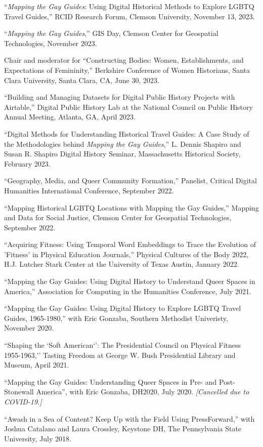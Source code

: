 \documentclass[11pt]{article}
\begin{document}
``\emph{Mapping the Gay Guides}: Using Digital Historical Methods to Explore LGBTQ Travel Guides,'' RCID Research Forum, Clemson University, November 13, 2023.

``\emph{Mapping the Gay Guides},'' GIS Day, Clemson Center for Geospatial Technologies, November 2023. 

Chair and moderator for ``Constructing Bodies: Women, Establishments, and Expectations of Femininity,'' Berkshire Conference of Women Historians, Santa Clara University, Santa Clara, CA, June 30, 2023.

``Building and Managing Datasets for Digital Public History Projects with Airtable,'' Digital Public History Lab at the National Council on Public History Annual Meeting, Atlanta, GA, April 2023. 

``Digital Methods for Understanding Historical Travel Guides: A Case Study of the Methodologies behind \emph{Mapping the Gay Guides},'' L. Dennis Shapiro and Susan R. Shapiro Digital History Seminar, Massachusetts Historical Society, February 2023. 

``Geography, Media, and Queer Community Formation,'' Panelist, Critical Digital Humanities International Conference, September 2022.

``Mapping Historical LGBTQ Locations with Mapping the Gay Guides,'' Mapping and Data for Social Justice, Clemson Center for Geospatial Technologies, September 2022.

``Acquiring Fitness: Using Temporal Word Embeddings to Trace the Evolution of 'Fitness' in Physical Education Journals,'' Physical Cultures of the Body 2022, H.J. Lutcher Stark Center at the University of Texas Austin, January 2022.

``Mapping the Gay Guides: Using Digital History to Understand Queer Spaces in America,'' Association for Computing in the Humanities Conference, July 2021.

``Mapping the Gay Guides: Using Digital History to Explore LGBTQ Travel Guides, 1965-1980,'' with Eric Gonzaba, Southern Methodist Univeristy, November 2020.

``Shaping the `Soft American`': The Presidential Council on Physical Fitness 1955-1963,'' Tasting Freedom at George W. Bush Presidential Library and Museum, April 2021.

``Mapping the Gay Guides: Understanding Queer Spaces in Pre- and Post-Stonewall America'', with Eric Gonzaba, DH2020, July 2020. \emph{[Cancelled due to COVID-19.]}

``Awash in a Sea of Content? Keep Up with the Field Using PressForward,'' with Joshua Catalano and Laura Crossley, Keystone DH, The Pennsylvania State University, July 2018.
\end{document}
